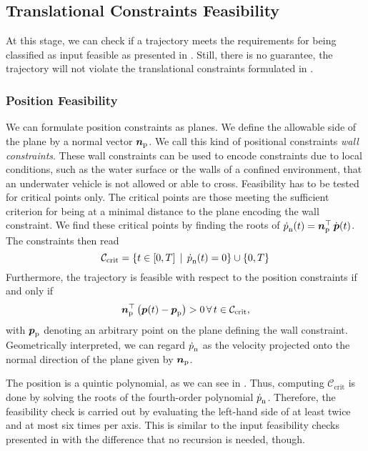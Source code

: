 \subsection{Translational Constraints Feasibility}
At this stage, we can check if a trajectory meets the requirements for being classified as input feasible as presented in . Still, there is no guarantee, the trajectory will not violate the translational constraints formulated in .

\subsubsection{Position Feasibility}
\label{sec:position-feasibility}
We can formulate position constraints as planes. We define the allowable side of the plane by a normal vector $\mbox{$\bm{n}$}_{\text{p}}$. We call this kind of positional constraints \textit{wall constraints}. These wall constraints can be used to encode constraints due to local conditions, such as the water surface or the walls of a confined environment, that an underwater vehicle is not allowed or able to cross. Feasibility has to be tested for critical points only. The critical points are those meeting the sufficient criterion for being at a minimal distance to the plane encoding the wall constraint. We find these critical points by finding the roots of $\mbox{$\dot{p}$}_{\text{n}}(t) = \mbox{$\bm{n}$}_{\text{p}}^\top \, \mbox{$\dot{\bm{p}}$}(t)$.
The constraints then read
\begin{equation}
	\mathcal{C}_{\text{crit}} =
	\left\{
		t \in \left[ 0, T \right]
		\,\mid\, \mbox{$\dot{p}$}_{\text{n}}(t) = 0
	\right\}
	\cup
	\left\{0,T\right\}
\end{equation}
Furthermore, the trajectory is feasible with respect to the position constraints if and only if
\begin{equation}
	\label{eq:position-feasibility-criterion}
	\mbox{$\bm{n}$}_\text{p}^\top
	\left(
		\mbox{$\bm{p}$}(t) - \mbox{$\bm{p}$}_{\text{p}}
	\right)
	> 0
	\,\forall\, t \in \mathcal{C}_{\text{crit}}
	,
\end{equation}
with $\mbox{$\bm{p}$}_{\text{p}}$ denoting an arbitrary point on the plane defining the wall constraint. Geometrically interpreted, we can regard $\mbox{$\dot{p}$}_{\text{n}}$ as the velocity projected onto the normal direction of the plane given by $\mbox{$\bm{n}$}_{\text{p}}$.

The position is a quintic polynomial, as we can see in . Thus, computing $\mathcal{C}_{\text{crit}}$ is done by solving the roots of the fourth-order polynomial $\mbox{$\dot{p}$}_{\text{n}}$. Therefore, the feasibility check is carried out by evaluating the left-hand side of  at least twice and at most six times per axis. This is similar to the input feasibility checks presented in  with the difference that no recursion is needed, though.



